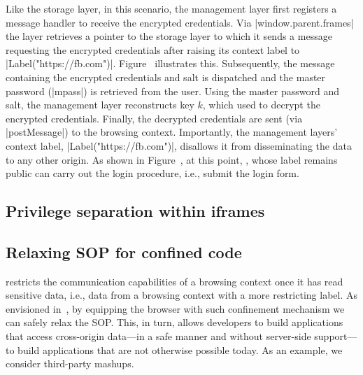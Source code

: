 Like the storage layer, in this scenario, the management layer first
registers a message handler to receive the encrypted credentials.
%
Via \js|window.parent.frames| the layer retrieves a pointer to the
storage layer to which it sends a message requesting the encrypted
credentials after raising its context label to
\js|Label("https://fb.com")|.
%
Figure~ illustrates this.
%
Subsequently, the message containing the encrypted
credentials and salt is dispatched and the
master password (\js|mpass|) is retrieved from the user. 
%
Using the master password and salt, the management layer reconstructs
key $k$, which used to decrypt the encrypted credentials.
%
Finally, the decrypted credentials are sent (via \js|postMessage|) to
the  browsing context.
%
Importantly, the management layers' context label,
\js|Label("https://fb.com")|, disallows it from disseminating the data
to any other origin.
%
As shown in Figure~, at this point,
, whose label remains public can carry out the login
procedure, i.e., submit the login form.


\subsection{Privilege separation within iframes}
\label{sec:system:extension}


\subsection{Relaxing SOP for confined code}
\label{sec:system:mashup}
%
\sys{} restricts the communication capabilities of a browsing context
once it has read sensitive data, i.e., data from a browsing context
with a more restricting label.
%
As envisioned in~, by equipping the browser with such
confinement mechanism we can safely relax the SOP.
%
This, in turn, allows developers to build applications that access
cross-origin data---in a safe manner and without server-side
support---to build applications that are not otherwise possible today.
%
As an example, we consider third-party mashups.


